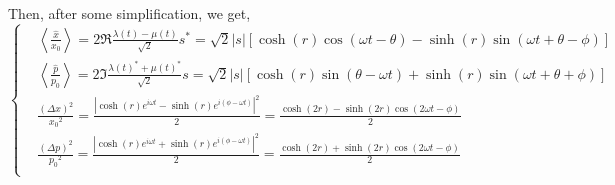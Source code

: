 \documentclass[12pt, twoside]{article}
\begin{document}
Then, after some simplification, we get, 
\begin{equation}
\begin{cases}

&{ \left\langle \frac{\hat{x}}{x_0} \right\rangle =2\Re{\frac{\lambda(t) - \mu(t)}{\sqrt{2}}s^*}=\sqrt{2}|s|[\cosh(r)\cos(\omega t - \theta) - \sinh(r)\sin(\omega t + \theta - \phi)]}\\
&{ \left\langle \frac{\hat{p}}{p_0} \right\rangle =2\Im{\frac{\lambda(t)^* + \mu(t)^*}{\sqrt{2}}s}=\sqrt{2}|s|[\cosh(r)\sin(\theta - \omega t) + \sinh(r)\sin(\omega t + \theta + \phi)]}\\
& { \frac{(\Delta x)^2}{{x_0}^2} = \frac { |\cosh(r)e^{i\omega t} - \sinh(r)e^{i(\phi - \omega t)}|^2 } { 2 } =  \frac{\cosh(2r) - \sinh(2r)\cos(2\omega t-\phi) }{2} }\\
& { \frac{(\Delta p)^2}{{p_0}^2} = \frac { |\cosh(r)e^{i\omega t} + \sinh(r)e^{i(\phi - \omega t)}|^2 } { 2 } =  \frac{\cosh(2r) + \sinh(2r)\cos(2\omega t-\phi) }{2} }\\

\end{cases}\end{equation}
\end{document}
